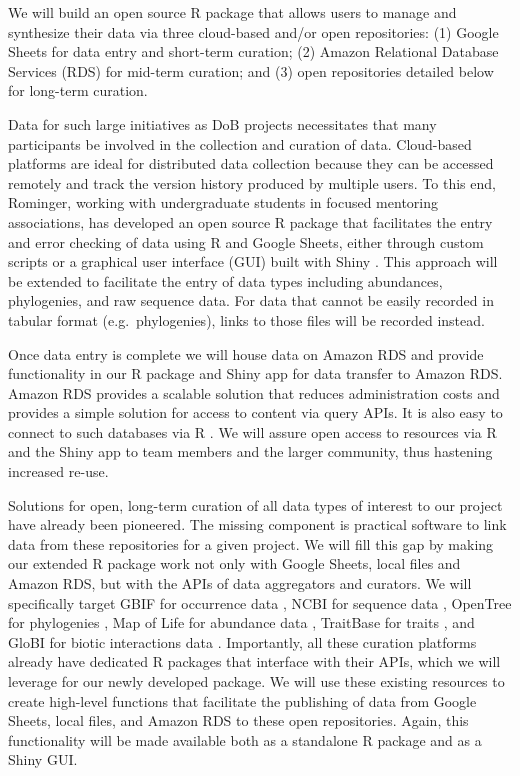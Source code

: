 \documentclass[11pt]{article}
\begin{document}
We will build an open source R package that allows users to manage and
synthesize their data via three cloud-based and/or open repositories:
(1) Google Sheets for data entry and short-term curation; (2) Amazon
Relational Database Services (RDS) for mid-term curation; and (3) open
repositories detailed below for long-term curation.

Data for such large initiatives as DoB projects necessitates that many
participants be involved in the collection and curation of data.
Cloud-based platforms are ideal for distributed data collection because
they can be accessed remotely and track the version history produced by
multiple users. To this end, Rominger, working with undergraduate
students in focused mentoring associations, has developed an open source
R package \cite{Rominger2016-mq} that facilitates the entry and error
checking of data using R and Google Sheets, either through custom
scripts or a graphical user interface (GUI) built with Shiny
\cite{RStudio_Inc2013-bt}. This approach will be extended to facilitate
the entry of data types including abundances, phylogenies, and raw
sequence data. For data that cannot be easily recorded in tabular format
(e.g.~phylogenies), links to those files will be recorded instead.

Once data entry is complete we will house data on Amazon RDS and provide
functionality in our R package and Shiny app for data transfer to Amazon
RDS. Amazon RDS provides a scalable solution that reduces administration
costs and provides a simple solution for access to content via query
APIs. It is also easy to connect to such databases via R
\cite{Wickham2015-cj}. We will assure open access to resources via R and
the Shiny app to team members and the larger community, thus hastening
increased re-use.

Solutions for open, long-term curation of all data types of interest to
our project have already been pioneered. The missing component is
practical software to link data from these repositories for a given
project. We will fill this gap by making our extended R package work not
only with Google Sheets, local files and Amazon RDS, but with the APIs
of data aggregators and curators. We will specifically target GBIF for
occurrence data \cite{Flemons2007-eg}, NCBI for sequence data
\cite{Sherry2001-pn,Benson1993-jf}, OpenTree for phylogenies
\cite{Hinchliff2015-vi}, Map of Life for abundance data
\cite{Jetz2012-uq,Guralnick2017-xb}, TraitBase for traits
\cite{Bartomeus2018-zq}, and GloBI for biotic interactions data
\cite{Poelen2014-lg}. Importantly, all these curation platforms already
have dedicated R packages
\cite{Chamberlain2014-ds,Winter2017-ei,Michonneau2016-yc,Molina2017-hm,Poelen2018-vp}
that interface with their APIs, which we will leverage for our newly
developed package. We will use these existing resources to create
high-level functions that facilitate the publishing of data from Google
Sheets, local files, and Amazon RDS to these open repositories. Again,
this functionality will be made available both as a standalone R package
and as a Shiny GUI.
\end{document}
